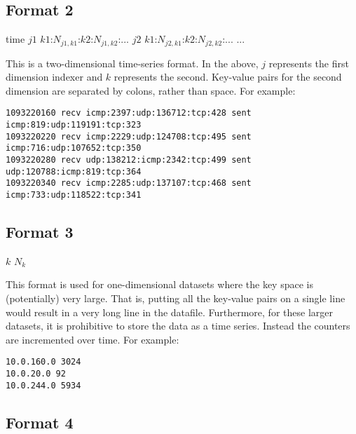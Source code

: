 \documentclass{report}
\begin{document}
\subsection{Format 2}

\noindent
\begin{tt}time $j1$ $k1$:$N_{j1,k1}$:$k2$:$N_{j1,k2}$:... $j2$ $k1$:$N_{j2,k1}$:$k2$:$N_{j2,k2}$:... ...
\end{tt}

\vspace{1ex}\noindent
This is a two-dimensional time-series format.  In the above,
$j$ represents the first dimension indexer and $k$ represents
the second.  Key-value pairs for the second dimension are
separated by colons, rather than space.  For example:

\begin{footnotesize}\begin{verbatim}
1093220160 recv icmp:2397:udp:136712:tcp:428 sent icmp:819:udp:119191:tcp:323
1093220220 recv icmp:2229:udp:124708:tcp:495 sent icmp:716:udp:107652:tcp:350
1093220280 recv udp:138212:icmp:2342:tcp:499 sent udp:120788:icmp:819:tcp:364
1093220340 recv icmp:2285:udp:137107:tcp:468 sent icmp:733:udp:118522:tcp:341
\end{verbatim}\end{footnotesize}

\subsection{Format 3}

\noindent
\begin{tt}$k$ $N_{k}$
\end{tt}

\vspace{1ex}\noindent
This format is used for one-dimensional datasets where the key space
is (potentially) very large.  That is, putting all the key-value pairs
on a single line would result in a very long line in the datafile.
Furthermore, for these larger datasets, it is prohibitive to
store the data as a time series.  Instead the counters are incremented
over time.  For example:

\begin{verbatim}
10.0.160.0 3024
10.0.20.0 92
10.0.244.0 5934
\end{verbatim}

\subsection{Format 4}
\end{document}
